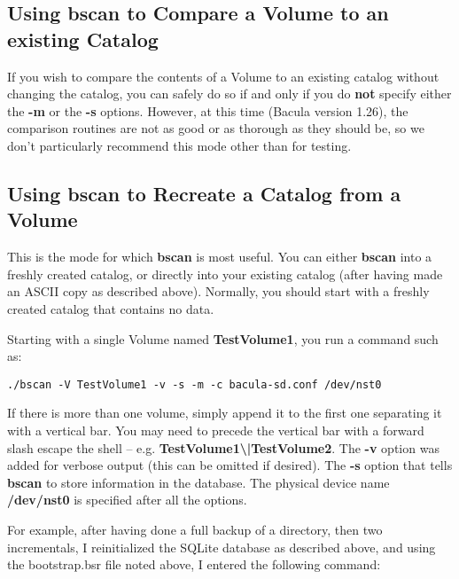 \subsection{Using bscan to Compare a Volume to an existing Catalog}

If you wish to compare the contents of a Volume to an existing catalog without
changing the catalog, you can safely do so if and only if you do {\bf not}
specify either the {\bf -m} or the {\bf -s} options. However, at this time
(Bacula version 1.26), the comparison routines are not as good or as thorough
as they should be, so we don't particularly recommend this mode other than for
testing. 

\subsection{Using bscan to Recreate a Catalog from a Volume}

This is the mode for which {\bf bscan} is most useful. You can either {\bf
bscan} into a freshly created catalog, or directly into your existing catalog
(after having made an ASCII copy as described above). Normally, you should
start with a freshly created catalog that contains no data. 

Starting with a single Volume named {\bf TestVolume1}, you run a command such
as: 

\footnotesize
\begin{verbatim}
./bscan -V TestVolume1 -v -s -m -c bacula-sd.conf /dev/nst0
\end{verbatim}
\normalsize

If there is more than one volume, simply append it to the first one separating
it with a vertical bar. You may need to precede the vertical bar with a
forward slash escape the shell -- e.g. {\bf
TestVolume1\textbackslash{}|TestVolume2}. The {\bf -v} option was added for
verbose output (this can be omitted if desired). The {\bf -s} option that
tells {\bf bscan} to store information in the database. The physical device
name {\bf /dev/nst0} is specified after all the options. 

{\bf} For example, after having done a full backup of a directory, then two
incrementals, I reinitialized the SQLite database as described above, and
using the bootstrap.bsr file noted above, I entered the following command: 

